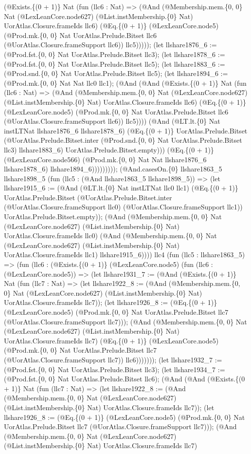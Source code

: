 \documentclass[11pt]{article}
\begin{document}
(@Exists.\{(0 + 1)\} Nat (fun (llc6 : Nat) => (@And (@Membership.mem.\{0, 0\} Nat (@LexLeanCore.node627) (@List.instMembership.\{0\} Nat) UorAtlas.Closure.frameIds llc6) (@Eq.\{(0 + 1)\} (@LexLeanCore.node5) (@Prod.mk.\{0, 0\} Nat UorAtlas.Prelude.Bitset llc6 (@UorAtlas.Closure.frameSupport llc6)) llc5))))); (let llshare1876\_6 := (@Prod.fst.\{0, 0\} Nat UorAtlas.Prelude.Bitset llc3); (let llshare1878\_6 := (@Prod.fst.\{0, 0\} Nat UorAtlas.Prelude.Bitset llc5); (let llshare1883\_6 := (@Prod.snd.\{0, 0\} Nat UorAtlas.Prelude.Bitset llc5); (let llshare1894\_6 := (@Prod.mk.\{0, 0\} Nat Nat llc0 llc1); (@And (@And (@Exists.\{(0 + 1)\} Nat (fun (llc6 : Nat) => (@And (@Membership.mem.\{0, 0\} Nat (@LexLeanCore.node627) (@List.instMembership.\{0\} Nat) UorAtlas.Closure.frameIds llc6) (@Eq.\{(0 + 1)\} (@LexLeanCore.node5) (@Prod.mk.\{0, 0\} Nat UorAtlas.Prelude.Bitset llc6 (@UorAtlas.Closure.frameSupport llc6)) llc5)))) (@And (@LT.lt.\{0\} Nat instLTNat llshare1876\_6 llshare1878\_6) (@Eq.\{(0 + 1)\} UorAtlas.Prelude.Bitset (@UorAtlas.Prelude.Bitset.inter (@Prod.snd.\{0, 0\} Nat UorAtlas.Prelude.Bitset llc3) llshare1883\_6) UorAtlas.Prelude.Bitset.empty))) (@Eq.\{(0 + 1)\} (@LexLeanCore.node566) (@Prod.mk.\{0, 0\} Nat Nat llshare1876\_6 llshare1878\_6) llshare1894\_6))))))))); (@And.casesOn.\{0\} llshare1863\_5 llshare1898\_5 (fun (llc5 : (@And llshare1863\_5 llshare1898\_5)) => (let llshare1915\_6 := (@And (@LT.lt.\{0\} Nat instLTNat llc0 llc1) (@Eq.\{(0 + 1)\} UorAtlas.Prelude.Bitset (@UorAtlas.Prelude.Bitset.inter (@UorAtlas.Closure.frameSupport llc0) (@UorAtlas.Closure.frameSupport llc1)) UorAtlas.Prelude.Bitset.empty)); (@And (@Membership.mem.\{0, 0\} Nat (@LexLeanCore.node627) (@List.instMembership.\{0\} Nat) UorAtlas.Closure.frameIds llc0) (@And (@Membership.mem.\{0, 0\} Nat (@LexLeanCore.node627) (@List.instMembership.\{0\} Nat) UorAtlas.Closure.frameIds llc1) llshare1915\_6)))) llc4 (fun (llc5 : llshare1863\_5) => (fun (llc6 : (@Exists.\{(0 + 1)\} (@LexLeanCore.node5) (fun (llc6 : (@LexLeanCore.node5)) => (let llshare1931\_7 := (@And (@Exists.\{(0 + 1)\} Nat (fun (llc7 : Nat) => (let llshare1922\_8 := (@And (@Membership.mem.\{0, 0\} Nat (@LexLeanCore.node627) (@List.instMembership.\{0\} Nat) UorAtlas.Closure.frameIds llc7)); (let llshare1926\_8 := (@Eq.\{(0 + 1)\} (@LexLeanCore.node5) (@Prod.mk.\{0, 0\} Nat UorAtlas.Prelude.Bitset llc7 (@UorAtlas.Closure.frameSupport llc7))); (@And (@Membership.mem.\{0, 0\} Nat (@LexLeanCore.node627) (@List.instMembership.\{0\} Nat) UorAtlas.Closure.frameIds llc7) (@Eq.\{(0 + 1)\} (@LexLeanCore.node5) (@Prod.mk.\{0, 0\} Nat UorAtlas.Prelude.Bitset llc7 (@UorAtlas.Closure.frameSupport llc7)) llc6))))))); (let llshare1932\_7 := (@Prod.fst.\{0, 0\} Nat UorAtlas.Prelude.Bitset llc3); (let llshare1934\_7 := (@Prod.fst.\{0, 0\} Nat UorAtlas.Prelude.Bitset llc6); (@And (@And (@Exists.\{(0 + 1)\} Nat (fun (llc7 : Nat) => (let llshare1922\_8 := (@And (@Membership.mem.\{0, 0\} Nat (@LexLeanCore.node627) (@List.instMembership.\{0\} Nat) UorAtlas.Closure.frameIds llc7)); (let llshare1926\_8 := (@Eq.\{(0 + 1)\} (@LexLeanCore.node5) (@Prod.mk.\{0, 0\} Nat UorAtlas.Prelude.Bitset llc7 (@UorAtlas.Closure.frameSupport llc7))); (@And (@Membership.mem.\{0, 0\} Nat (@LexLeanCore.node627) (@List.instMembership.\{0\} Nat) UorAtlas.Closure.frameIds llc7) 
\end{document}
